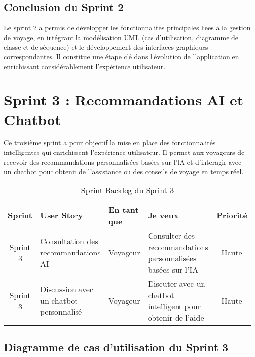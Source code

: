 \subsection*{Conclusion du Sprint 2}

Le sprint 2 a permis de développer les fonctionnalités principales liées à la gestion de voyage, 
en intégrant la modélisation UML (cas d’utilisation, diagramme de classe et de séquence) et 
le développement des interfaces graphiques correspondantes. 
Il constitue une étape clé dans l’évolution de l’application en enrichissant considérablement l’expérience utilisateur.


\section{Sprint 3 : Recommandations AI et Chatbot}

Ce troisième sprint a pour objectif la mise en place des fonctionnalités intelligentes 
qui enrichissent l’expérience utilisateur. 
Il permet aux voyageurs de recevoir des recommandations personnalisées basées sur l’IA 
et d’interagir avec un chatbot pour obtenir de l’assistance ou des conseils de voyage en temps réel.

\begin{table}[H]
\centering
\begin{tabular}{|c|l|l|l|c|}
\hline
\textbf{Sprint} & \textbf{User Story} & \textbf{En tant que} & \textbf{Je veux} & \textbf{Priorité} \\
\hline
Sprint 3 & Consultation des recommandations AI & Voyageur & Consulter des recommandations personnalisées basées sur l’IA & Haute \\
\hline
Sprint 3 & Discussion avec un chatbot personnalisé & Voyageur & Discuter avec un chatbot intelligent pour obtenir de l’aide & Haute \\
\hline
\end{tabular}
\caption{Sprint Backlog du Sprint 3}
\end{table}

\subsection{Diagramme de cas d’utilisation du Sprint 3}

